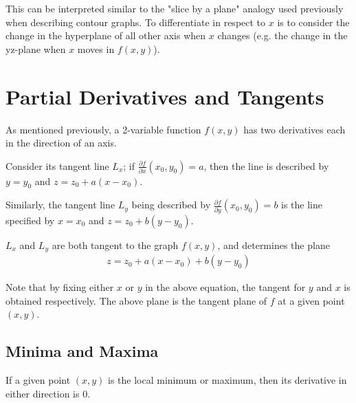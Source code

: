 \documentclass[12pt]{article}
\theoremstyle{definition}
\begin{document}
	This can be interpreted similar to the "slice by a plane" analogy used previously when describing contour graphs. To differentiate in respect to $x$ is to consider the change in the hyperplane of all other axis when $x$ changes (e.g. the change in the yz-plane when $x$ moves in $f(x, y)$).
	
	\section{Partial Derivatives and Tangents}
	
	As mentioned previously, a 2-variable function $f(x, y)$ has two derivatives each in the direction of an axis.
	
	Consider its tangent line $L_x$; if $\frac{\partial f}{\partial x}(x_0, y_0) = a$, then the line is described by $y = y_0$ and $z = z_0 + a(x - x_0)$.
	
	Similarly, the tangent line $L_y$ being described by $\frac{\partial f}{\partial y}(x_0, y_0) = b$ is the line specified by $x = x_0$ and $z = z_0 + b(y - y_0)$.
	
	$L_x$ and $L_y$ are both tangent to the graph $f(x, y)$, and determines the plane
	\begin{gather*}
		z = z_0 + a(x - x_0) + b(y - y_0)
	\end{gather*}
	
	Note that by fixing either $x$ or $y$ in the above equation, the tangent for $y$ and $x$ is obtained respectively. The above plane is the tangent plane of $f$ at a given point $(x, y)$.
	
	\subsection{Minima and Maxima}
	
	If a given point $(x, y)$ is the local minimum or maximum, then its derivative in either direction is $0$. 
		
\end{document}
